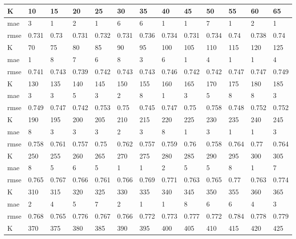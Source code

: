 \begin{appendices}
\begin{center} \label{tab12}
	\begin{tabularx}{\textwidth}{|l|X|X|X|X|X|X|X|X|X|X|X|X|} 
		\hline 
		K & 10 & 15 & 20 & 25 & 30 & 35 & 40 & 45 & 50 & 55 & 60 & 65 \\ \hline 
		mae & 3 & 1 & 2 & 1 & 6 & 6 & 1 & 1 & 7 & 1 & 2 & 1 \\ \hline 
		rmse & 0.731 & 0.73 & 0.731 & 0.732 & 0.731 & 0.736 & 0.734 & 0.731 & 0.734 & 0.74 & 0.738 & 0.74 \\ \hline 
		\hline 
		K & 70 & 75 & 80 & 85 & 90 & 95 & 100 & 105 & 110 & 115 & 120 & 125 \\ \hline 
		mae & 1 & 8 & 7 & 6 & 8 & 3 & 6 & 1 & 4 & 1 & 1 & 4 \\ \hline 
		rmse & 0.741 & 0.743 & 0.739 & 0.742 & 0.743 & 0.743 & 0.746 & 0.742 & 0.742 & 0.747 & 0.747 & 0.749 \\ \hline 
		\hline 
		K & 130 & 135 & 140 & 145 & 150 & 155 & 160 & 165 & 170 & 175 & 180 & 185 \\ \hline 
		mae & 3 & 3 & 5 & 3 & 2 & 8 & 1 & 3 & 5 & 8 & 8 & 3 \\ \hline 
		rmse & 0.749 & 0.747 & 0.742 & 0.753 & 0.75 & 0.745 & 0.747 & 0.75 & 0.758 & 0.748 & 0.752 & 0.752 \\ \hline 
		\hline 
		K & 190 & 195 & 200 & 205 & 210 & 215 & 220 & 225 & 230 & 235 & 240 & 245 \\ \hline 
		mae & 8 & 3 & 3 & 3 & 2 & 3 & 8 & 1 & 3 & 1 & 1 & 3 \\ \hline 
		rmse & 0.758 & 0.761 & 0.757 & 0.75 & 0.762 & 0.757 & 0.759 & 0.76 & 0.758 & 0.764 & 0.77 & 0.764 \\ \hline 
		\hline 
		K & 250 & 255 & 260 & 265 & 270 & 275 & 280 & 285 & 290 & 295 & 300 & 305 \\ \hline 
		mae & 8 & 5 & 6 & 5 & 1 & 1 & 2 & 5 & 5 & 8 & 1 & 7 \\ \hline 
		rmse & 0.765 & 0.767 & 0.766 & 0.761 & 0.766 & 0.769 & 0.771 & 0.763 & 0.765 & 0.77 & 0.763 & 0.774 \\ \hline 
		\hline 
		K & 310 & 315 & 320 & 325 & 330 & 335 & 340 & 345 & 350 & 355 & 360 & 365 \\ \hline 
		mae & 2 & 4 & 5 & 7 & 2 & 1 & 1 & 8 & 6 & 6 & 4 & 3 \\ \hline 
		rmse & 0.768 & 0.765 & 0.776 & 0.767 & 0.766 & 0.772 & 0.773 & 0.777 & 0.772 & 0.784 & 0.778 & 0.779 \\ \hline 
		\hline 
		K & 370 & 375 & 380 & 385 & 390 & 395 & 400 & 405 & 410 & 415 & 420 & 425 \\ \hline 

\end{tabularx}
\end{center}
\end{appendices}
